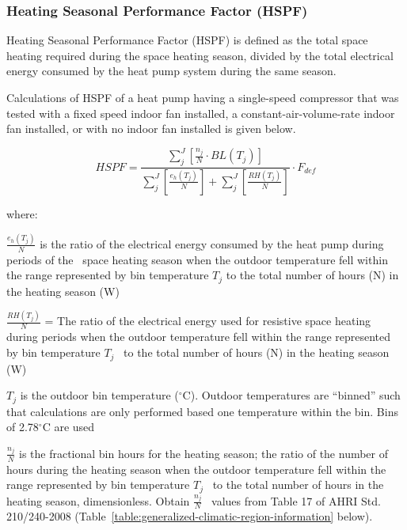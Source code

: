 \subsubsection{Heating Seasonal Performance Factor (HSPF)}\label{heating-seasonal-performance-factor-hspf}

Heating Seasonal Performance Factor (HSPF) is defined as the total space heating required during the space heating season, divided by the total electrical energy consumed by the heat pump system during the same season.

Calculations of HSPF of a heat pump having a single-speed compressor that was tested with a fixed speed indoor fan installed, a constant-air-volume-rate indoor fan installed, or with no indoor fan installed is given below.

\begin{equation}
HSPF = \frac{{\sum\limits_j^J {\left[ {\frac{{{n_j}}}{N} \cdot BL({T_j})} \right]} }}{{\sum\limits_j^J {\left[ {\frac{{{e_h}({T_j})}}{N}} \right]}  + \sum\limits_j^J {\left[ {\frac{{RH({T_j})}}{N}} \right]} }} \cdot {F_{def}}
\end{equation}

where:

\(\frac{{{e_h}({T_j})}}{N}\) is the ratio of the electrical energy consumed by the heat pump during periods of the ~space heating season when the outdoor temperature fell within the range represented by bin temperature \({T_j}\) to the total number of hours (N) in the heating season (W)

\(\frac{{RH({T_j})}}{N}\) = The ratio of the electrical energy used for resistive space heating during periods when the outdoor temperature fell within the range represented by bin temperature \({T_j}\) ~to the total number of hours (N) in the heating season (W)

\({T_j}\) is the outdoor bin temperature (\(^{\circ}\)C). Outdoor temperatures are ``binned'' such that calculations are only performed based one temperature within the bin. Bins of 2.78\(^{\circ}\)C are used

\(\frac{{{n_j}}}{N}\) is the fractional bin hours for the heating season; the ratio of the number of hours during the heating season when the outdoor temperature fell within the range represented by bin temperature \({T_j}\) ~to the total number of hours in the heating season, dimensionless. Obtain \(\frac{{{n_j}}}{N}\) ~values from Table 17 of AHRI Std. 210/240-2008 (Table~\ref{table:generalized-climatic-region-information} below).

